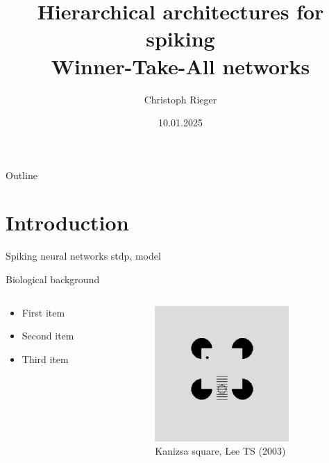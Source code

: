 \documentclass[aspectratio=169]{beamer}
\title[Short Title]{ Hierarchical architectures for spiking \\ Winner-Take-All networks}
\author{Christoph Rieger}
\date{10.01.2025}
\institute{IML}
\begin{document}
\begin{frame}[plain]
  \maketitle
\end{frame}


\begin{frame}{Outline}
  \tableofcontents
\end{frame}


\section{Introduction}

\begin{frame}{Spiking neural networks}
  stdp, model
\end{frame}

\begin{frame}{Biological background}
  \begin{columns}[onlytextwidth]
		
	\begin{column}{0.5\textwidth}
      \begin{itemize}
        \item First item
        \item Second item
        \item Third item
      \end{itemize}
	\end{column}
		
	\begin{column}{0.5\textwidth}
      \begin{figure}
        \includegraphics[width=0.4\linewidth]{../Latex/figures/kanizsaSquare.PNG}
      \\   \footnotesize Kanizsa square, Lee TS (2003)
      \end{figure} 
  	\end{column}
  		
  \end{columns}
\end{frame}
\end{document}
